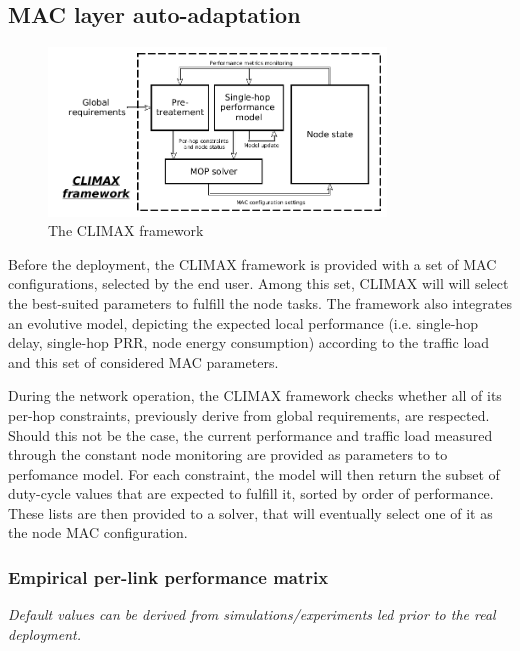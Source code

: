\documentclass[12pt,journal,compsoc]{IEEEtran}
\begin{document}

\subsection{MAC layer auto-adaptation}

\begin{figure}[t]
	\begin{centering}
	\includegraphics[width=0.8\textwidth]{figs/CLIMAX.png}
	\caption{The CLIMAX framework}
	\label{core_climax}
	\end{centering}
\end{figure}

Before the deployment, the CLIMAX framework is provided with a set of MAC configurations, selected by the end user. Among this set, CLIMAX will will select the best-suited parameters to fulfill the node tasks. The framework also integrates an evolutive model, depicting the expected local performance (i.e. single-hop delay, single-hop PRR, node energy consumption) according to the traffic load and this set of considered MAC parameters.

During the network operation, the CLIMAX framework checks whether all of its per-hop constraints, previously derive from global requirements, are respected. Should this not be the case, the current performance and traffic load measured through the constant node monitoring are provided as parameters to to perfomance model. For each constraint, the model will then return the subset of duty-cycle values that are expected to fulfill it, sorted by order of performance. These lists are then provided to a solver, that will eventually select one of it as the node MAC configuration.

\subsubsection{Empirical per-link performance matrix}
\label{empir-matrix}
\textit{Default values can be derived from simulations/experiments led prior to the real deployment.}
\end{document}
